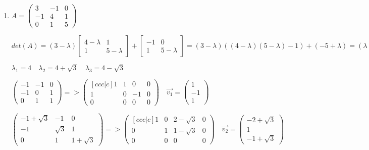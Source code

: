 \documentclass[12pt,letterpaper]{article}
\begin{document}
\begin{enumerate}[label=(\alph*)]
        
        \item
        $A = \begin{pmatrix}
            3 & -1 & 0\\
            -1 & 4 & 1\\
            0 & 1 & 5
        \end{pmatrix}$
        
        $det(A) = (3 - \lambda)\begin{bmatrix}
            4 - \lambda & 1 \\
            1 & 5 - \lambda
        \end{bmatrix} + \begin{bmatrix}
            -1 & 0 \\
            1 & 5 - \lambda
        \end{bmatrix} = (3 - \lambda)((4 - \lambda)(5 - \lambda) - 1) + (-5 + \lambda) = (\lambda - 4)(\lambda^2 - 8\lambda + 13)$
        
        $\lambda_1 = 4\quad\lambda_{2} = 4 + \sqrt{3}\quad\lambda_{3} = 4 - \sqrt{3}$
        
        $\begin{pmatrix} -1 & -1 & 0 \\ -1 & 0 & 1 \\ 0 & 1 & 1 \end{pmatrix} => 
                \begin{pmatrix}[ccc|c] 1 & 1 & 0 & 0 \\ 1 & 0 & -1 & 0 \\ 0 & 0 & 0 & 0 \end{pmatrix} \quad \vec{v_1} = \begin{pmatrix} 1 \\ -1 \\ 1 \end{pmatrix}$
                
        $\begin{pmatrix} -1 + \sqrt{3} & -1 & 0 \\ -1 & \sqrt{3} & 1 \\ 0 & 1 & 1 + \sqrt{3} \end{pmatrix} => \begin{pmatrix}[ccc|c] 1 & 0 & 2 - \sqrt{3} & 0 \\ 0 & 1 & 1 - \sqrt{3} & 0 \\ 0 & 0 & 0 & 0 \end{pmatrix} \quad \vec{v_2} = \begin{pmatrix} -2 + \sqrt{3} \\ 1 \\ -1 + \sqrt{3} \end{pmatrix}$
            

\end{enumerate}
\end{document}
